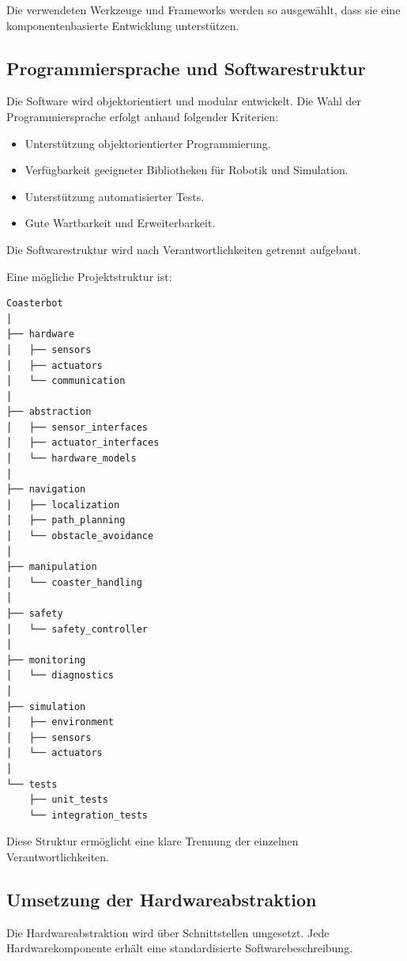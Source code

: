 \documentclass[
  a4paper,
  12pt,
  DIV=12,        %
  parskip=half,  %
  headings=small %
]{scrartcl}
\theoremstyle{definition}
\providecommand{\tightlist}{%
  \setlength{\itemsep}{0pt}\setlength{\parskip}{0pt}}
\theoremstyle{definition}
\begin{document}
Die verwendeten Werkzeuge und Frameworks werden so ausgewählt, dass sie
eine komponentenbasierte Entwicklung unterstützen.

\subsection{Programmiersprache und
Softwarestruktur}\label{programmiersprache-und-softwarestruktur}

Die Software wird objektorientiert und modular entwickelt. Die Wahl der
Programmiersprache erfolgt anhand folgender Kriterien:

\begin{itemize}
\tightlist
\item
  Unterstützung objektorientierter Programmierung.
\item
  Verfügbarkeit geeigneter Bibliotheken für Robotik und Simulation.
\item
  Unterstützung automatisierter Tests.
\item
  Gute Wartbarkeit und Erweiterbarkeit.
\end{itemize}

Die Softwarestruktur wird nach Verantwortlichkeiten getrennt aufgebaut.

Eine mögliche Projektstruktur ist:

\begin{verbatim}
Coasterbot
│
├── hardware
│   ├── sensors
│   ├── actuators
│   └── communication
│
├── abstraction
│   ├── sensor_interfaces
│   ├── actuator_interfaces
│   └── hardware_models
│
├── navigation
│   ├── localization
│   ├── path_planning
│   └── obstacle_avoidance
│
├── manipulation
│   └── coaster_handling
│
├── safety
│   └── safety_controller
│
├── monitoring
│   └── diagnostics
│
├── simulation
│   ├── environment
│   ├── sensors
│   └── actuators
│
└── tests
    ├── unit_tests
    └── integration_tests
\end{verbatim}

Diese Struktur ermöglicht eine klare Trennung der einzelnen
Verantwortlichkeiten.

\subsection{Umsetzung der
Hardwareabstraktion}\label{umsetzung-der-hardwareabstraktion}

Die Hardwareabstraktion wird über Schnittstellen umgesetzt. Jede
Hardwarekomponente erhält eine standardisierte Softwarebeschreibung.
\end{document}
